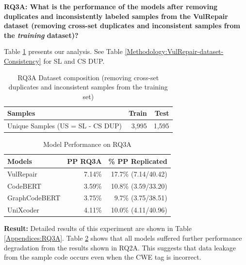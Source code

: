 \textbf{RQ3A: What is the performance of the models after removing duplicates and inconsistently labeled samples from the VulRepair dataset (removing cross-set duplicates and inconsistent samples from the \emph{training} dataset)?}

Table \ref{Methodology:RQ3A--removed-samples-with-multilple-CWEs} presents our analysis. See Table \ref{Methodology:VulRepair-dataset-Consistency} for SL and CS DUP.


\begin{table}[h]
\centering
  \caption{RQ3A Dataset composition (removing cross-set duplicates and inconsistent samples from the training set)}
  \label{Methodology:RQ3A--removed-samples-with-multilple-CWEs}
  \begin{tabular}{|l|r|r|}
    \hline
    Samples &Train &Test\\
    \hline
    Unique Samples (US = SL - CS DUP)                    &3,995  &1,595\\
  \hline
\end{tabular}
\end{table}

\begin{table}[h]
\centering
\caption{Model Performance on RQ3A}
  \label{Methodology:RQ3Adataset-ModelPerformance}
  \begin{tabular}{|l|r|r|}
    \hline
    Models          & PP RQ3A & \% PP Replicated\\ 
    \hline
    VulRepair       & 7.14\%  & 17.7\% (7.14/40.42)\\
    \hline
    CodeBERT        & 3.59\% & 10.8\% (3.59/33.20)\\
    \hline
    GraphCodeBERT   & 3.75\% & 9.7\% (3.75/38.51)\\
    \hline
    UniXcoder       & 4.11\% & 10.0\% (4.11/40.96)\\
  \hline
\end{tabular}
\end{table}

\textbf{Result:}
Detailed results of this experiment are shown in Table \ref{Appendices:RQ3A}. Table \ref{Methodology:RQ3Adataset-ModelPerformance} shows that all models suffered further performance degradation from the results shown in RQ2A.
This suggests that data leakage from the sample code occurs even when the CWE tag is incorrect.


